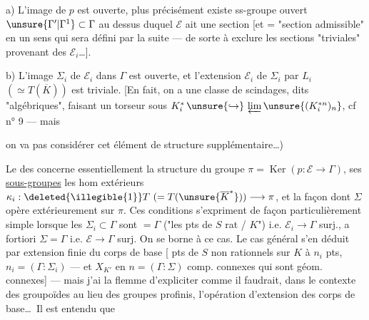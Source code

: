 a) L'image \inserted{\(\Sigma\)} de \(p\) est ouverte, plus précisément existe
ss-groupe ouvert \(\unsure{\Gamma'|\Gamma^1}\subset\Gamma\) au dessus duquel
\(\mathcal E\) ait une section [et = "section admissible" en un sens qui sera
défini par la suite --- de sorte à exclure les sections "triviales" provenant
des \(\mathcal E_i\)\ldots].

b) L'image \(\Sigma_i\) de \(\mathcal E_i\) dans \(\Gamma\) est ouverte, et
l'extension \(\mathcal E_i\) de \(\Sigma_i\) par \(L_i\)
\((\simeq T(\overline K))\) est triviale. [En fait, on a une classe
 de scindages, dits "algébriques", faisant un
torseur sous
\(K_i^*\,\unsure{\hookrightarrow}\,\varprojlim\unsure{(K_i^{*n})_n}\),
cf n° 9  --- mais



on va pas considérer  cet élément de structure
supplémentaire\ldots)


Le  des  concerne
essentiellement la structure du groupe \(\pi=\operatorname{Ker}(p:\mathcal E\to\Gamma)\),
ses  \uline{sous-groupes}
 les hom extérieurs
\(\kappa_i:\deleted{\illegible{1}}T\ (=T(\unsure{\overline K^*}))\longrightarrow\pi\),
et la façon dont \(\Sigma\) opère extérieurement sur \(\pi\).
Ces conditions s'expriment de façon particulièrement simple lorsque les
\(\Sigma_i\subset\Gamma\) sont \(=\Gamma\)
("les pts de \(S\)  rat / \(K\)") i.e.
\(\mathcal E_i\to\Gamma\) surj., a fortiori \(\Sigma=\Gamma\) i.e.
\(\mathcal E\to\Gamma\) surj. On se borne à ce cas. Le cas général s'en déduit
par extension finie du corps de base
[  pts de
\(S\) non rationnels sur \(K\)
à \(n_i\) pts, 
\(n_i=(\Gamma:\Sigma_i)\) \unsure{\(\}\)} --- et \(X_{K'}\)
  en \(n=(\Gamma:\Sigma)\) comp. connexes
qui sont géom. connexes] --- mais j'ai la flemme d'expliciter comme il faudrait,
dans le contexte des groupoïdes au  lieu des groupes
profinis, l'opération d'extension des corps de base\ldots\ Il est entendu que



